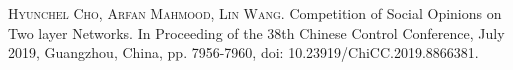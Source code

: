 \begin{publications}{99}
    \item\textsc{Hyunchel Cho, Arfan Mahmood, Lin Wang}. {Competition of Social Opinions on Two layer Networks}. In Proceeding of the 38th Chinese Control Conference, July 2019, Guangzhou, China, pp. 7956-7960, doi: 10.23919/ChiCC.2019.8866381.
\end{publications}
